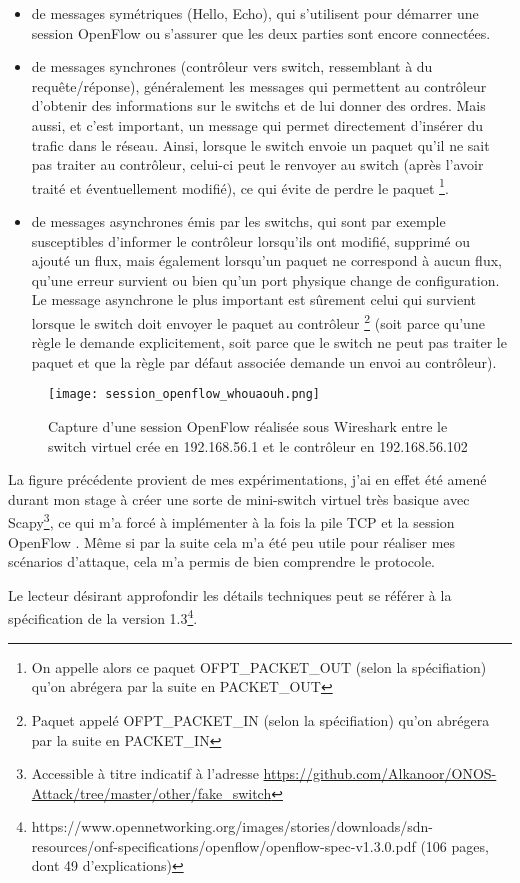 \begin{itemize}

\item de messages symétriques (Hello, Echo), qui s'utilisent pour démarrer une session OpenFlow ou s'assurer que les deux parties sont encore connectées.

\item de messages synchrones (contrôleur vers switch, ressemblant à du requête/réponse), généralement les messages qui permettent au contrôleur d'obtenir des informations sur le switchs et de lui donner des ordres. Mais aussi, et c'est important, un message qui permet directement d'insérer du trafic dans le réseau. Ainsi, lorsque le switch envoie un paquet qu'il ne sait pas traiter au contrôleur, celui-ci peut le renvoyer au switch (après l'avoir traité et éventuellement modifié), ce qui évite de perdre le paquet \footnote{On appelle alors ce paquet OFPT\_PACKET\_OUT (selon la spécifiation) qu'on abrégera par la suite en PACKET\_OUT}.

\item de messages asynchrones émis par les switchs, qui sont par exemple susceptibles d'informer le contrôleur lorsqu'ils ont modifié, supprimé ou ajouté un flux, mais également lorsqu'un paquet ne correspond à aucun flux, qu'une erreur survient ou bien qu'un port physique change de configuration. Le message asynchrone le plus important est sûrement celui qui survient lorsque le switch doit envoyer le paquet au contrôleur \footnote{Paquet appelé OFPT\_PACKET\_IN (selon la spécifiation) qu'on abrégera par la suite en PACKET\_IN} (soit parce qu'une règle le demande explicitement, soit parce que le switch ne peut pas traiter le paquet et que la règle par défaut associée demande un envoi au contrôleur).

\end{itemize}

\begin{figure}[h]
  	\centering
  	\texttt{[image: session\_openflow\_whouaouh.png]}
  	\caption{Capture d'une session OpenFlow réalisée sous Wireshark entre le switch virtuel crée en 192.168.56.1 et le contrôleur en 192.168.56.102}
\end{figure}

La figure précédente provient de mes expérimentations, j'ai en effet été amené durant mon stage à créer une sorte de mini-switch virtuel très basique avec Scapy\footnote{Accessible à titre indicatif à l'adresse  \url{https://github.com/Alkanoor/ONOS-Attack/tree/master/other/fake_switch}}, ce qui m'a forcé à implémenter à la fois la pile TCP et la session OpenFlow . Même si par la suite cela m'a été peu utile pour réaliser mes scénarios d'attaque, cela m'a permis de bien comprendre le protocole.

Le lecteur désirant approfondir les détails techniques peut se référer à la spécification de la version 1.3\footnote{\label{OF_13}https://www.opennetworking.org/images/stories/downloads/sdn-resources/onf-specifications/openflow/openflow-spec-v1.3.0.pdf (106 pages, dont 49 d'explications)}.